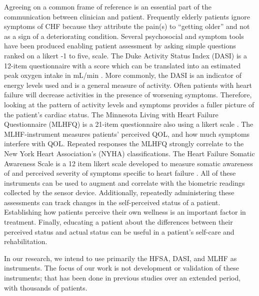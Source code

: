 Agreeing on a common frame of reference is an essential part of the communication between clinician and patient.  Frequently elderly patients ignore symptoms of CHF because they attribute the pain(s) to “getting older” and not as a sign of a deteriorating condition. Several psychosocial and symptom tools have been produced enabling patient assessment by asking simple questions ranked on a likert -1 to five, scale. The Duke Activity Status Index (DASI) is a 12-item questionnaire with a score which can be translated into an estimated peak oxygen intake in mL/min \cite{Hlatky1989}. More commonly, the DASI is an indicator of energy levels used and is a general measure of activity.  Often patients with heart failure will decrease activities in the presence of worsening symptoms. Therefore, looking at the pattern of activity levels and symptoms provides a fuller picture of the patient's cardiac status. The Minnesota Living with Heart Failure Questionnaire (MLHFQ) is a 21-item questionnaire also using a likert scale \cite{Jurgens2009}. The MLHF-instrument measures patients' perceived QOL, and how much symptoms interfere with QOL. Repeated responses the MLHFQ strongly correlate to the New York Heart Association's (NYHA) classifications. The Heart Failure Somatic Awareness Scale is a 12 item likert scale developed to measure somatic awareness of and perceived severity of symptoms specific to heart failure \cite{Jurgens2006}. All of these instruments can be used to augment and correlate with the biometric readings collected by the sensor device. Additionally, repeatedly administering these assessments can track changes in the self-perceived status of a patient. Establishing how patients perceive their own wellness is an important factor in treatment. Finally, educating a patient about the differences between their perceived status and actual status can be useful in a patient's self-care and rehabilitation.

In our research, we intend to use primarily the HFSA, DASI, and MLHF as instruments. The focus of our work is not development or validation of these instruments; that has been done in previous studies over an extended period, with thousands of patients.

